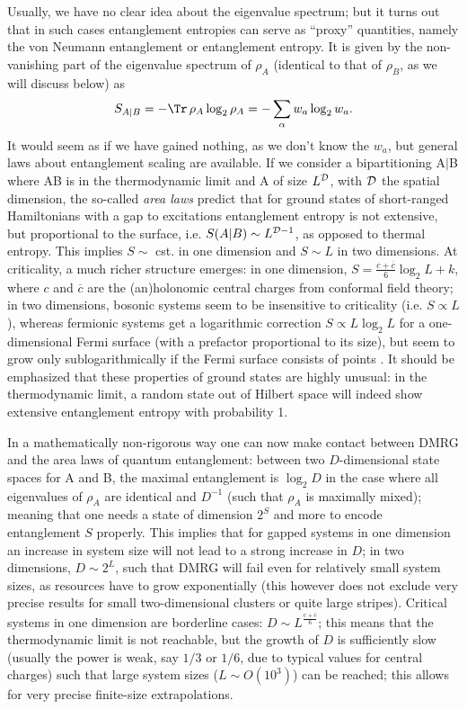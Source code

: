 Usually, we have no clear idea about the eigenvalue spectrum; but it turns out that in such cases 
entanglement entropies can serve as ``proxy'' quantities, namely the von Neumann entanglement or entanglement entropy. It is given by the non-vanishing part of the eigenvalue spectrum of $\rho_A$ (identical to that of $\rho_B$, as we will discuss below) as
\begin{equation}
S_{A|B}  = - \Tr\, \rho_A \log_2 \rho_A = - \sum_\alpha w_a \log_2 w_a .
\end{equation}
It would seem as if we have gained nothing, as we don't know the $w_a$, but general laws about entanglement scaling are available. If we consider a bipartitioning A$|$B where AB is in the thermodynamic limit and A of size $L^{\cal D}$, with ${\cal D}$ the spatial dimension, the so-called {\em area laws}
\cite{Eisert10,Bekenstein73,Srednicki93,Callan94,Plenio05} predict that for ground states of short-ranged Hamiltonians with a gap to excitations entanglement entropy is not extensive, but proportional to the surface, i.e. $S(A|B) \sim L^{{\cal D}-1}$, as opposed to thermal entropy. This implies $S \sim $ cst. in one dimension and $S \sim L$ in two dimensions. At criticality, a much richer structure emerges: in one dimension,
$S = \frac{c+\overline{c}}{6} \log_2 L + k$, where $c$ and $\overline{c}$ are the (an)holonomic central charges from conformal field theory\cite{Vidal03,Latorre04}; in two dimensions, bosonic systems seem to be insensitive to criticality (i.e. $S \propto L$)\cite{Srednicki93,Barthel06}, whereas fermionic systems get a logarithmic correction $S \propto L \log_2 L$ for a one-dimensional Fermi surface (with a prefactor proportional to its size), but seem to grow only sublogarithmically if the Fermi surface consists of points \cite{Barthel06,Gioev06}. It should be emphasized that these properties of ground states are highly unusual: in the thermodynamic limit, a random state out of Hilbert space will indeed show extensive entanglement entropy with probability 1.

In a mathematically non-rigorous way one can now make contact between DMRG and the area laws of quantum entanglement: between two $D$-dimensional state spaces for A and B, the maximal entanglement is $\log_2 D$ in the case where all eigenvalues of $\rho_A$ are identical and $D^{-1}$ (such that $\rho_A$ is maximally mixed); meaning that one needs a state of dimension $2^S$ and more to encode entanglement $S$ properly. This implies that for gapped systems in one dimension an increase in system size will not lead to a strong increase in $D$; in two dimensions, $D \sim 2^L$, such that DMRG will fail even for relatively small system sizes, as resources have to grow exponentially (this however does not exclude very precise results for small two-dimensional clusters or quite large stripes). Critical systems in one dimension are borderline cases: $D \sim L^{\frac{c+\overline{c}}{6}}$; this means that the thermodynamic limit is not reachable, but the growth of $D$ is sufficiently slow (usually the power is weak, say $1/3$ or $1/6$, due to typical values for central charges) such that large system sizes ($L \sim O(10^3)$) can be reached; this allows for very precise finite-size extrapolations.

